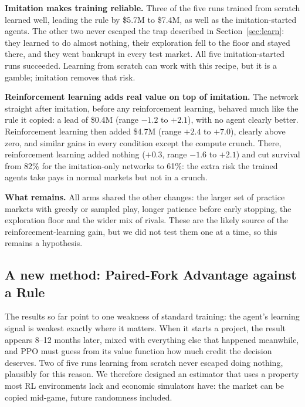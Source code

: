 \documentclass[11pt]{article}
\begin{document}
\textbf{Imitation makes training reliable.} Three of the five runs trained from scratch learned well, leading the rule by \$5.7M to \$7.4M, as well as the imitation-started agents. The other two never escaped the trap described in Section~\ref{sec:learn}: they learned to do almost nothing, their exploration fell to the floor and stayed there, and they went bankrupt in every test market. All five imitation-started runs succeeded. Learning from scratch can work with this recipe, but it is a gamble; imitation removes that risk.

\textbf{Reinforcement learning adds real value on top of imitation.} The network straight after imitation, before any reinforcement learning, behaved much like the rule it copied: a lead of \$0.4M (range $-1.2$ to $+2.1$), with no agent clearly better. Reinforcement learning then added \$4.7M (range $+2.4$ to $+7.0$), clearly above zero, and similar gains in every condition except the compute crunch. There, reinforcement learning added nothing ($+0.3$, range $-1.6$ to $+2.1$) and cut survival from 82\% for the imitation-only networks to 61\%: the extra risk the trained agents take pays in normal markets but not in a crunch.

\textbf{What remains.} All arms shared the other changes: the larger set of practice markets with greedy or sampled play, longer patience before early stopping, the exploration floor and the wider mix of rivals. These are the likely source of the reinforcement-learning gain, but we did not test them one at a time, so this remains a hypothesis.

\subsection{A new method: Paired-Fork Advantage against a Rule}
\label{sec:pfar}

The results so far point to one weakness of standard training: the agent's learning signal is weakest exactly where it matters. When it starts a project, the result appears 8--12 months later, mixed with everything else that happened meanwhile, and PPO must guess from its value function how much credit the decision deserves. Two of five runs learning from scratch never escaped doing nothing, plausibly for this reason. We therefore designed an estimator that uses a property most RL environments lack and economic simulators have: the market can be copied mid-game, future randomness included.
\end{document}
